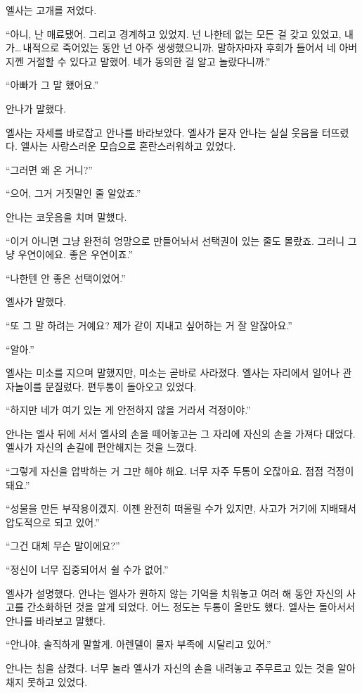 엘사는 고개를 저었다.

``아니, 난 매료됐어. 그리고 경계하고 있었지. 넌 나한테 없는 모든 걸 갖고 있었고, 내가\ldots\,내적으로 죽어있는 동안 넌 아주 생생했으니까. 말하자마자 후회가 들어서 네 아버지껜 거절할 수 있다고 말했어. 네가 동의한 걸 알고 놀랐다니까.''

``아빠가 그 말 했어요.''

안나가 말했다.

엘사는 자세를 바로잡고 안나를 바라보았다. 엘사가 묻자 안나는 실실 웃음을 터뜨렸다. 엘사는 사랑스러운 모습으로 혼란스러워하고 있었다.

``그러면 왜 온 거니?''

``으어, 그거 거짓말인 줄 알았죠.''

안나는 코웃음을 치며 말했다.

``이거 아니면 그냥 완전히 엉망으로 만들어놔서 선택권이 있는 줄도 몰랐죠. 그러니 그냥 우연이에요. 좋은 우연이죠.''

``나한텐 안 좋은 선택이었어.''

엘사가 말했다.

``또 그 말 하려는 거예요? 제가 같이 지내고 싶어하는 거 잘 알잖아요.''

``알아.''

엘사는 미소를 지으며 말했지만, 미소는 곧바로 사라졌다. 엘사는 자리에서 일어나 관자놀이를 문질렀다. 편두통이 돌아오고 있었다.

``하지만 네가 여기 있는 게 안전하지 않을 거라서 걱정이야.''

안나는 엘사 뒤에 서서 엘사의 손을 떼어놓고는 그 자리에 자신의 손을 가져다 대었다. 엘사가 자신의 손길에 편안해지는 것을 느꼈다.

``그렇게 자신을 압박하는 거 그만 해야 해요. 너무 자주 두통이 오잖아요. 점점 걱정이 돼요.''

``성물을 만든 부작용이겠지. 이젠 완전히 떠올릴 수가 있지만, 사고가 거기에 지배돼서 압도적으로 되고 있어.''

``그건 대체 무슨 말이에요?''

``정신이 너무 집중되어서 쉴 수가 없어.''

엘사가 설명했다. 안나는 엘사가 원하지 않는 기억을 치워놓고 여러 해 동안 자신의 사고를 간소화하던 것을 알게 되었다. 어느 정도는 두통이 올만도 했다. 엘사는 돌아서서 안나를 바라보고 말했다.

``안나야, 솔직하게 말할게. 아렌델이 물자 부족에 시달리고 있어.''

안나는 침을 삼켰다. 너무 놀라 엘사가 자신의 손을 내려놓고 주무르고 있는 것을 알아채지 못하고 있었다.

